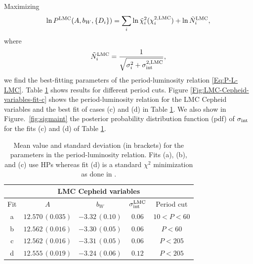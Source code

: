 Maximizing  
\begin{equation}
\label{Eq:likelihood-HP-LMC}
\ln P^{\mathrm{LMC}}(A,b_W,\lbrace D_i \rbrace) = \sum_{i} \ln \tilde{\chi}_i^{2}(\chi^{2,\mathrm{LMC}}_{i}) + \ln \tilde{N}^{\mathrm{LMC}}_{i},
\end{equation}
where 
\begin{equation}
\label{Eq:normalization-LMC}
\tilde{N}^{\mathrm{LMC}}_i = \frac{1}{\sqrt{\sigma_i^2 +\sigma^{2,\mathrm{LMC}}_{\mathrm{int}}}},
\end{equation}
we find the best-fitting parameters of the period-luminosity relation \eqref{Eq:P-L-LMC}. Table \ref{Table:LMC-fits} shows results for different period cuts. Figure \ref{Fig:LMC-Cepheid-variables-fit-c} shows the period-luminosity relation for the LMC Cepheid variables and the best fit of cases (c) and (d) in Table \ref{Table:LMC-fits}. We also show in Figure.\ \ref{fig:sigmaint} the posterior probability distribution function (pdf) of $\sigma_{\mathrm{int}}$ for the fits (c) and (d) of Table \ref{Table:LMC-fits}.

\begin{table}[tbp]
\centering
\begin{tabular}{@{}ccccc}
\hline
\multicolumn{5}{c}{LMC Cepheid variables} \\
\hline
Fit & $A$ & $b_W$ & $\sigma_{\mathrm{int}}^{\mathrm{LMC}}$ & Period cut \\
\hline
 a & $12.570\,(0.035)$ & $-3.32\,(0.10)$ & $0.06$ & $10<P<60$ \\
  
 b & $12.562\,(0.016)$&$-3.30\,(0.05)$ & $0.06$ & $P<60$ \\

 c & $12.562\,(0.016)$& $-3.31\,(0.05)$& $0.06$ & $P<205$ \\

 d & $12.555\,(0.019)$& $-3.24\,(0.06)$& $0.12$ & $P<205$ \\
\hline
\end{tabular}
\caption{\label{Table:LMC-fits} Mean value and standard deviation (in brackets) for the parameters in the period-luminosity relation. Fits (a), (b), and (c) use HPs whereas fit (d) is a standard $\chi^2$ minimization as done in \cite{Efstathiou:2013via}.}
\end{table}


